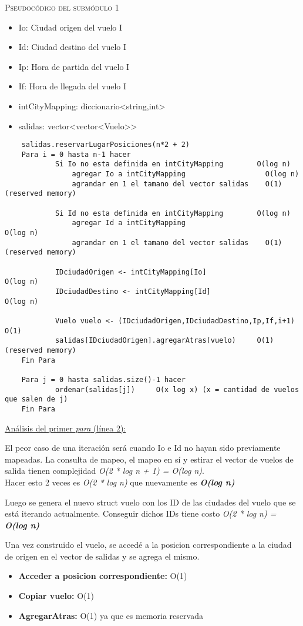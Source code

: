 \textsc{Pseudocódigo del submódulo 1}
\begin{itemize}
\item Io: Ciudad origen del vuelo I
\item Id: Ciudad destino del vuelo I
\item Ip: Hora de partida del vuelo I
\item If: Hora de llegada del vuelo I
\item intCityMapping: diccionario\textless string,int\textgreater
\item salidas: vector\textless vector\textless Vuelo\textgreater\textgreater
\end{itemize}
\begin{lstlisting}
	salidas.reservarLugarPosiciones(n*2 + 2)
	Para i = 0 hasta n-1 hacer
			Si Io no esta definida en intCityMapping        O(log n)
				agregar	Io a intCityMapping                   O(log n)	
				agrandar en 1 el tamano del vector salidas    O(1) (reserved memory)
				
			Si Id no esta definida en intCityMapping        O(log n)
				agregar	Id a intCityMapping				            O(log n)	
				agrandar en 1 el tamano del vector salidas    O(1) (reserved memory)	
		
			IDciudadOrigen <- intCityMapping[Io]				    O(log n)
			IDciudadDestino <- intCityMapping[Id]				    O(log n)			
			
			Vuelo vuelo <- (IDciudadOrigen,IDciudadDestino,Ip,If,i+1)	  O(1)		
			salidas[IDciudadOrigen].agregarAtras(vuelo)     O(1) (reserved memory)
	Fin Para	
			
	Para j = 0 hasta salidas.size()-1 hacer
			ordenar(salidas[j])		O(x log x) (x = cantidad de vuelos que salen de j)
	Fin Para
\end{lstlisting}

\underline{Análisis del primer \textit{para} (línea 2):}

\noindent El peor caso de una iteración será cuando Io e Id no hayan sido previamente mapeadas.
La consulta de mapeo, el mapeo en sí y estirar el vector de vuelos de salida tienen complejidad \textit{O(2 * log n + 1) = O(log n)}.\\ Hacer esto 2 veces es \textit{O(2 * log n)} que nuevamente es \textbf{\textit{O(log n)}}

\noindent Luego se genera el nuevo struct vuelo con los ID de las ciudades del vuelo que se está iterando actualmente. Conseguir dichos IDs tiene costo \textit{O(2 * log n) = \textbf{O(log n)}}

\noindent Una vez construido el vuelo, se accedé a la posicion correspondiente a la ciudad de origen en el vector de salidas y se agrega el mismo.
\begin{itemize}
\item \textbf{Acceder a posicion correspondiente:} O(1)
\item \textbf{Copiar vuelo:} O(1)
\item \textbf{AgregarAtras:} O(1) ya que es memoria reservada
\end{itemize}

